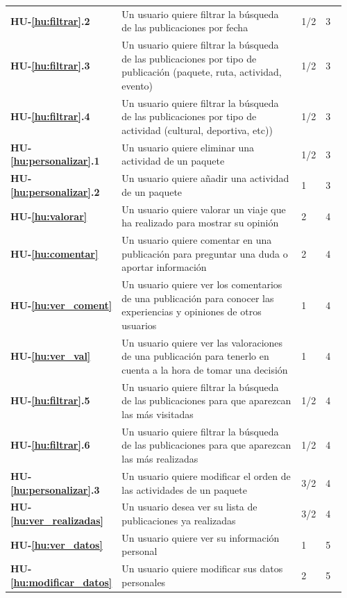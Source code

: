 \documentclass[11pt]{article}
\begin{document}
\begin{longtable}{p{0.12\linewidth}p{0.7\linewidth}p{0.07\linewidth}p{0.07\linewidth}}
  \rowcolor{dollarbill}
  \textbf{HU-\ref{hu:filtrar}.2} & Un usuario quiere filtrar la búsqueda de las publicaciones por fecha & 1/2 & 3\\ 
  \rowcolor{dollarbill}
  \textbf{HU-\ref{hu:filtrar}.3} & Un usuario quiere filtrar la búsqueda de las publicaciones por tipo de publicación (paquete, ruta, actividad, evento) & 1/2 & 3\\ 
  \rowcolor{dollarbill}
  \textbf{HU-\ref{hu:filtrar}.4} & Un usuario quiere filtrar la búsqueda de las publicaciones por tipo de actividad (cultural, deportiva, etc)) & 1/2 & 3\\ 
  \rowcolor{dollarbill}
  \textbf{HU-\ref{hu:personalizar}.1} & Un usuario quiere eliminar una actividad de un paquete & 1/2 & 3 \\ 
  \textbf{HU-\ref{hu:personalizar}.2} & Un usuario quiere añadir una actividad de un paquete & 1 & 3 \\
  \textbf{HU-\ref{hu:valorar}} & Un usuario quiere valorar un viaje que ha realizado para mostrar su opinión & 2 & 4\\
  \textbf{HU-\ref{hu:comentar}} & Un usuario quiere comentar en una publicación para preguntar una duda o aportar información & 2 & 4\\ 
  \textbf{HU-\ref{hu:ver_coment}} & Un usuario quiere ver los comentarios de una publicación para conocer las experiencias y opiniones de otros usuarios & 1 & 4\\ 
  \textbf{HU-\ref{hu:ver_val}} & Un usuario quiere ver las valoraciones de una publicación para tenerlo en cuenta a la hora de tomar una decisión & 1 & 4\\ 
  \textbf{HU-\ref{hu:filtrar}.5} & Un usuario quiere filtrar la búsqueda de las publicaciones para que aparezcan las más visitadas & 1/2 & 4\\ 
  \textbf{HU-\ref{hu:filtrar}.6} & Un usuario quiere filtrar la búsqueda de las publicaciones para que aparezcan las más realizadas & 1/2 & 4\\
  \textbf{HU-\ref{hu:personalizar}.3} & Un usuario quiere modificar el orden de las actividades de un paquete & 3/2 & 4 \\
  \textbf{HU-\ref{hu:ver_realizadas}} & Un usuario desea ver su lista de publicaciones ya realizadas & 3/2 & 4\\
  \textbf{HU-\ref{hu:ver_datos}} & Un usuario quiere ver su información personal & 1 & 5 \\
  \textbf{HU-\ref{hu:modificar_datos}} & Un usuario quiere modificar sus datos personales & 2 & 5 \\

\end{longtable}
\end{document}

